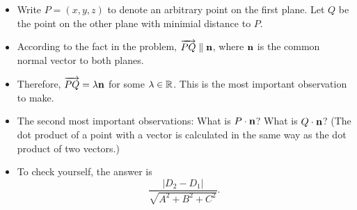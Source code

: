 \begin{hint}\leavevmode
  \begin{itemize}
    \item Write $P=(x,y,z)$ to denote an arbitrary point on the first plane. Let $Q$ be the point on the other plane with minimial distance to $P$.
    \item According to the fact in the problem, $\overrightarrow{PQ} \parallel \mathbf n$, where $\mathbf n$ is the common normal vector to both planes.
    \item Therefore, $\overrightarrow{PQ}=\lambda\mathbf n$ for some $\lambda\in\mathbb R$. This is the most important observation to make.
    \item The second most important observations: What is $P\cdot\mathbf n$? What is $Q\cdot\mathbf n$? (The dot product of a point with a vector is calculated in the same way as the dot product of two vectors.)
    \item To check yourself, the answer is
    \[\frac{|D_2-D_1|}{\sqrt{A^2+B^2+C^2}}.\]
  \end{itemize}
\end{hint}
